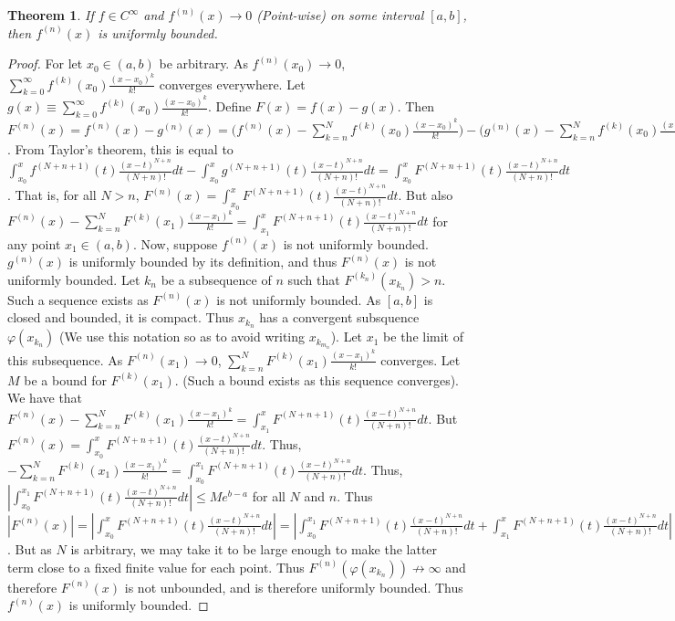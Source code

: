 \documentclass[oneside]{book}
\newtheorem{theorem}{Theorem}[section]
\theoremstyle{definition}
\begin{document}
\begin{theorem}
If $f\in C^{\infty}$ and $f^{(n)}(x)\rightarrow 0$ (Point-wise) on some interval $[a,b]$, then $f^{(n)}(x)$ is uniformly bounded.
\end{theorem}
\begin{proof}
For let $x_0\in (a,b)$ be arbitrary. As $f^{(n)}(x_0)\rightarrow 0$, $\sum_{k=0}^{\infty} f^{(k)}(x_0)\frac{(x-x_0)^{k}}{k!}$ converges everywhere. Let $g(x)\equiv \sum_{k=0}^{\infty} f^{(k)}(x_0)\frac{(x-x_0)^{k}}{k!}$. Define $F(x) = f(x)-g(x)$. Then $F^{(n)}(x) = f^{(n)}(x)-g^{(n)}(x) = \bigg(f^{(n)}(x)-\sum_{k=n}^{N} f^{(k)}(x_0)\frac{(x-x_0)^{k}}{k!}\bigg)-\bigg(g^{(n)}(x)-\sum_{k=n}^{N} f^{(k)}(x_0)\frac{(x-x_0)^{k}}{k!}\bigg)$. From Taylor's theorem, this is equal to \\ $\int_{x_0}^{x} f^{(N+n+1)}(t)\frac{(x-t)^{N+n}}{(N+n)!}dt - \int_{x_0}^{x} g^{(N+n+1)}(t)\frac{(x-t)^{N+n}}{(N+n)!}dt = \int_{x_0}^{x} F^{(N+n+1)}(t)\frac{(x-t)^{N+n}}{(N+n)!}dt$. That is, for all $N>n$, $F^{(n)}(x) = \int_{x_0}^{x} F^{(N+n+1)}(t)\frac{(x-t)^{N+n}}{(N+n)!}dt$. But also $F^{(n)}(x)-\sum_{k=n}^{N} F^{(k)}(x_1)\frac{(x-x_1)^k}{k!} = \int_{x_1}^{x} F^{(N+n+1)}(t)\frac{(x-t)^{N+n}}{(N+n)!}dt$ for any point $x_1 \in (a,b)$. Now, suppose $f^{(n)}(x)$ is not uniformly bounded. $g^{(n)}(x)$ is uniformly bounded by its definition, and thus $F^{(n)}(x)$ is not uniformly bounded. Let ${k_n}$ be a subsequence of $n$ such that $F^{(k_n)}(x_{k_n})>n$. Such a sequence exists as $F^{(n)}(x)$ is not uniformly bounded. As $[a,b]$ is closed and bounded, it is compact. Thus $x_{k_n}$ has a convergent subsquence $\varphi(x_{k_n})$ (We use this notation so as to avoid writing $x_{k_{m_n}}$). Let $x_1$ be the limit of this subsequence. As $F^{(n)}(x_1)\rightarrow 0$, $\sum_{k=n}^{N} F^{(k)}(x_1)\frac{(x-x_1)^k}{k!}$ converges. Let $M$ be a bound for $F^{(k)}(x_1)$. (Such a bound exists as this sequence converges). We have that $F^{(n)}(x)-\sum_{k=n}^{N} F^{(k)}(x_1)\frac{(x-x_1)^k}{k!} = \int_{x_1}^{x} F^{(N+n+1)}(t)\frac{(x-t)^{N+n}}{(N+n)!}dt$. But $F^{(n)}(x) = \int_{x_0}^{x} F^{(N+n+1)}(t)\frac{(x-t)^{N+n}}{(N+n)!}dt$. Thus, $-\sum_{k=n}^{N} F^{(k)}(x_1)\frac{(x-x_1)^k}{k!} = \int_{x_0}^{x_1} F^{(N+n+1)}(t)\frac{(x-t)^{N+n}}{(N+n)!}dt$. Thus, $|\int_{x_0}^{x_1} F^{(N+n+1)}(t)\frac{(x-t)^{N+n}}{(N+n)!}dt|\leq Me^{b-a}$ for all $N$ and $n$. Thus $|F^{(n)}(x)| = |\int_{x_0}^{x} F^{(N+n+1)}(t)\frac{(x-t)^{N+n}}{(N+n)!}dt| = |\int_{x_0}^{x_1} F^{(N+n+1)}(t)\frac{(x-t)^{N+n}}{(N+n)!}dt+\int_{x_1}^{x} F^{(N+n+1)}(t)\frac{(x-t)^{N+n}}{(N+n)!}dt| \leq Me^{b-a}+|\int_{x_1}^{x} F^{(N+n+1)}(t)\frac{(x-t)^{N+n}}{(N+n)!}dt|$. But as $N$ is arbitrary, we may take it to be large enough to make the latter term close to a fixed finite value for each point. Thus $F^{(n)}(\varphi(x_{k_n}))\not\rightarrow \infty$ and therefore $F^{(n)}(x)$ is not unbounded, and is therefore uniformly bounded. Thus $f^{(n)}(x)$ is uniformly bounded.
\end{proof}
\end{document}

